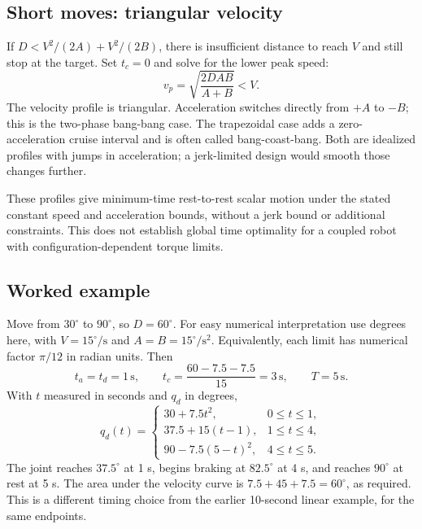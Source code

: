 \subsection{Short moves: triangular velocity}
If $D<V^2/(2A)+V^2/(2B)$, there is insufficient distance to reach $V$
and still stop at the target. Set $t_c=0$ and solve for the lower peak speed:
\begin{equation}
 v_p=\sqrt{\frac{2DAB}{A+B}}<V.
 \label{eq:l12-triangle}
\end{equation}
The velocity profile is triangular. Acceleration switches directly from
$+A$ to $-B$; this is the two-phase bang-bang case. The trapezoidal case
adds a zero-acceleration cruise interval and is often called
bang-coast-bang. Both are idealized profiles with jumps in acceleration;
a jerk-limited design would smooth those changes further.

These profiles give minimum-time rest-to-rest scalar motion under the
stated constant speed and acceleration bounds, without a jerk bound or
additional constraints. This does not establish global time optimality
for a coupled robot with configuration-dependent torque limits.

\subsection{Worked example}
Move from $30^\circ$ to $90^\circ$, so $D=60^\circ$. For easy numerical
interpretation use degrees here, with $V=15^\circ/\mathrm s$ and
$A=B=15^\circ/\mathrm s^2$. Equivalently, each limit has numerical
factor $\pi/12$ in radian units. Then
\[
 t_a=t_d=1\,\mathrm s,\qquad
 t_c=\frac{60-7.5-7.5}{15}=3\,\mathrm s,\qquad T=5\,\mathrm s.
\]
With $t$ measured in seconds and $q_d$ in degrees,
\[
 q_d(t)=\begin{cases}
 30+7.5t^2,&0\le t\le1,\\
 37.5+15(t-1),&1\le t\le4,\\
 90-7.5(5-t)^2,&4\le t\le5.
 \end{cases}
\]
The joint reaches $37.5^\circ$ at 1 s, begins braking at $82.5^\circ$
at 4 s, and reaches $90^\circ$ at rest at 5 s. The area under the velocity
curve is $7.5+45+7.5=60^\circ$, as required. This is a different timing
choice from the earlier 10-second linear example, for the same endpoints.

